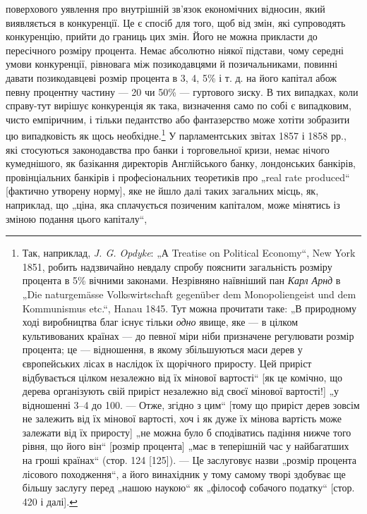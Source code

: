 \parcont{}  %
поверхового уявлення про внутрішній зв’язок економічних відносин,
який виявляється в конкуренції. Це є спосіб для того, щоб від
змін, які супроводять конкуренцію, прийти до границь цих змін.
Його не можна прикласти до пересічного розміру процента.
Немає абсолютно ніякої підстави, чому середні умови конкуренції,
рівновага між позикодавцями й позичальниками, повинні давати
позикодавцеві розмір процента в 3, 4, 5\% і т. д. на його капітал
абож певну процентну частину — 20 чи 50\% — гуртового
зиску. В тих випадках, коли справу-тут вирішує конкуренція як
така, визначення само по собі є випадковим, чисто емпіричним,
і тільки педантство або фантазерство може хотіти зобразити
цю випадковість як щось необхідне.\footnote{
Так, наприклад, \emph{J. G. Opdyke}: „А Treatise on Political Economy“, New
York 1851, робить надзвичайно невдалу спробу пояснити загальність розміру
процента в 5\% вічними законами. Незрівняно наївніший пан \emph{Карл Арнд} в „Die
naturgemässe Volkswirtschaft gegenüber dem Monopoliengeist und dem Kommunismus
etc.“, Hanau 1845. Тут можна прочитати таке: „В природному ході виробництва
благ існує тільки \emph{одно} явище, яке — в цілком культивованих країнах — до
певної міри ніби призначене регулювати розмір процента; це — відношення,
в якому збільшуються маси дерев у європейських лісах в наслідок їх щорічного
приросту. Цей приріст відбувається цілком незалежно від їх мінової вартості“
[як це комічно, що дерева організують свій приріст незалежно від своєї мінової
вартості!] „у відношенні 3--4 до 100. — Отже, згідно з цим“ [тому що приріст
дерев зовсім не залежить від їх мінової вартості, хоч і як дуже їх мінова вартість
може залежати від їх приросту] „не можна було б сподіватись падіння
нижче того рівня, що його він“ [розмір процента] „має в теперішній час у
найбагатших на гроші країнах“ (стор. 124 [125]). — Це заслуговує назви „розмір
процента лісового походження“, а його винахідник у тому самому творі здобуває
ще більшу заслугу перед „нашою наукою“ як „філософ собачого податку“
[стор. 420 і далі].
} У парламентських звітах
1857 і 1858 рр., які стосуються законодавства про банки і торговельної
кризи, немає нічого кумеднішого, як базікання директорів
Англійського банку, лондонських банкірів, провінціальних
банкірів і професіональних теоретиків про „real rate produced“
[фактично утворену норму], яке не йшло далі таких загальних
місць, як, наприклад, що „ціна, яка сплачується позиченим
капіталом, може мінятись із зміною подання цього капіталу“,
